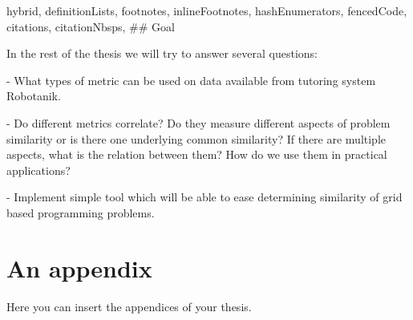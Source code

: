 \documentclass[
  digital, %
  table,   %
  lof,     %
  lot,     %
]{fithesis3}
\begin{document}
\begin{markdown*}{%
  hybrid,
  definitionLists,
  footnotes,
  inlineFootnotes,
  hashEnumerators,
  fencedCode,
  citations,
  citationNbsps,
}
## Goal

In the rest of the thesis we will try to answer several questions:

- What types of metric can be used on data available from tutoring system Robotanik.

- Do different metrics correlate? Do they measure different aspects of problem similarity or is there one underlying common similarity? If there are multiple aspects, what is the relation between them? How do we use them in practical applications?

- Implement simple tool which will be able to ease determining similarity of grid based programming problems.

%
%

\iffalse %

# Robotanik

In this chapter we will talk more about things that are specific to Robotanik and data used in our analysis.

Most of the experiments were executed on data collected from programming environment Robotanik available at [tutor.fi.muni.cz](http://tutor.fi.muni.cz/). Robotanik is programming environment with 78 handcrafted problems for student to solve. Goal of the student is to write program for robot to traverse board and collect all flowers. Each problem has board filled with tiles of stones, colored tiles (green, red, brown) and flowers.

## Data

**Problem statements**

**Solutions**

**Performance data**

## Chosen metrics

In this thesis we are consider only some metrics. We will describe them in detail in this chapter.

### Problem statement

### Solutions

### Performance data


%
%

# Tool

## Tool capabilities

## Chosen metrics

## Evaluation

### Compare metrics

### Collecting crowd-truth

## Visualisations

\fi %

\end{markdown*}

  \makeatletter\thesis@blocks@clear\makeatother
  \printindex

\appendix %
\chapter{An appendix}
Here you can insert the appendices of your thesis.
\end{document}
